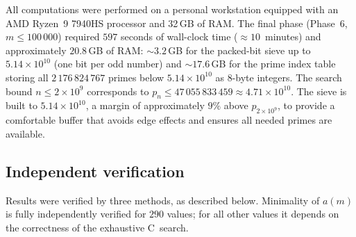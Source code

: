\documentclass[12pt]{article}
\begin{document}
	All computations were performed on a personal workstation equipped with
	an AMD Ryzen~9 7940HS processor and 32\,GB of RAM\@.
	The final phase (Phase~6, $m \leq 100\,000$) required $597$ seconds of
	wall-clock time ($\approx 10$~minutes) and approximately $20.8$\,GB of
	RAM: $\sim 3.2$\,GB for the packed-bit sieve up to
	$5.14 \times 10^{10}$ (one bit per odd number) and $\sim 17.6$\,GB for
	the prime index table storing all $2\,176\,824\,767$ primes below
	$5.14 \times 10^{10}$ as 8-byte integers.
	The search bound $n \leq 2 \times 10^9$ corresponds to
	$p_n \leq 47\,055\,833\,459 \approx 4.71 \times 10^{10}$.
	The sieve is built to $5.14 \times 10^{10}$, a margin of
	approximately $9\%$ above $p_{2 \times 10^9}$, to provide a
	comfortable buffer that avoids edge effects and ensures all needed
	primes are available.
	
	\subsection{Independent verification}
	\label{sec:verification}
	
	Results were verified by three methods, as described below.
	Minimality of $a(m)$ is fully independently verified for $290$
	values; for all other values it depends on the correctness of the
	exhaustive C~search.
	
\end{document}
